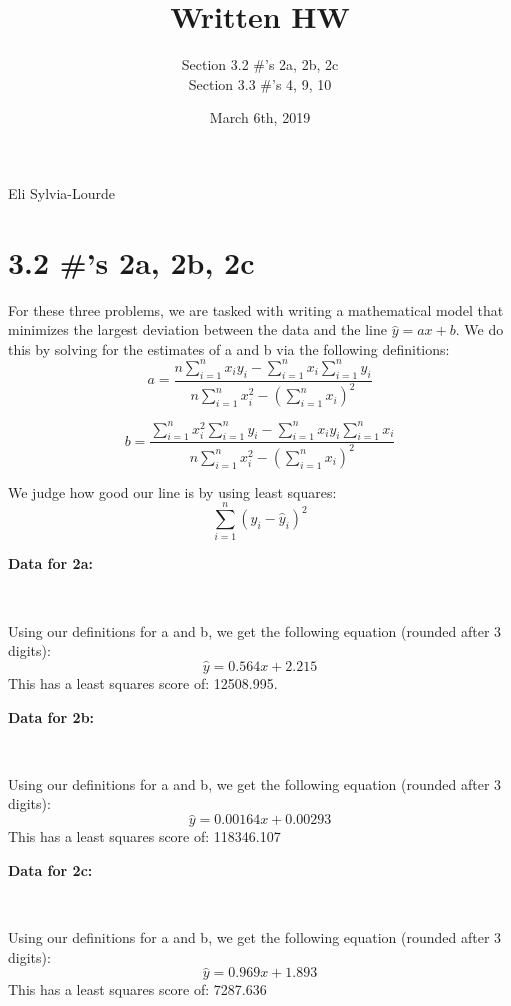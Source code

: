 \documentclass[12pt]{article} %
\title{Written HW}
\author{Section 3.2 \#'s 2a, 2b, 2c \\ Section 3.3 \#'s 4, 9, 10}
\date{March 6th, 2019}
\newcommand{\authors}{Eli Sylvia-Lourde}
\begin{document}
\hfill\authors %
{\let\newpage\relax\maketitle} %

\section*{3.2 \#'s 2a, 2b, 2c}
For these three problems, we are tasked with writing a mathematical model that minimizes the largest deviation between the data and the line $\hat{y}=ax+b$. We do this by solving for the estimates of a and b via the following definitions:
\[a = \frac{n\sum_{i=1}^{n}x_{i}y_{i}-\sum_{i=1}^{n}x_{i}\sum_{i=1}^{n}y_{i}}{n\sum_{i=1}^{n}x_{i}^2-(\sum_{i=1}^{n}x_{i})^2}\]

\[b = \frac{\sum_{i=1}^{n}x_{i}^2\sum_{i=1}^{n}y_{i}-\sum_{i=1}^{n}x_{i}y_{i}\sum_{i=1}^{n}x_{i}}{n\sum_{i=1}^{n}x_{i}^2-(\sum_{i=1}^{n}x_{i})^2}\]

We judge how good our line is by using least squares:
\[\sum_{i=1}^{n}(y_{i}-\hat{y}_{i})^2\]

\textbf{Data for 2a:}

{\centering
{}
\\}

Using our definitions for a and b, we get the following equation (rounded after 3 digits):
\[\hat{y}=0.564x+2.215\]
This has a least squares score of: 12508.995.

\textbf{Data for 2b:}


{\centering
{}
\\}

Using our definitions for a and b, we get the following equation (rounded after 3 digits):
\[\hat{y}=0.00164x+0.00293\]
This has a least squares score of: 118346.107


\textbf{Data for 2c:}

{\centering
{}
\\}

Using our definitions for a and b, we get the following equation (rounded after 3 digits):
\[\hat{y}=0.969x+1.893\]
This has a least squares score of: 7287.636
\end{document}
